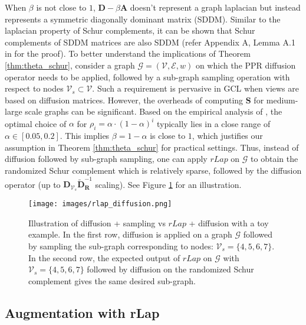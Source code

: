 \documentclass{article}
\def\mA{{\mathbf{A}}}
\def\mD{{\mathbf{D}}}
\def\mR{{\mathbf{R}}}
\def\mS{{\mathbf{S}}}
\def\gE{{\mathcal{E}}}
\def\gG{{\mathcal{G}}}
\def\gV{{\mathcal{V}}}
\theoremstyle{plain}
\theoremstyle{definition}
\theoremstyle{remark}
\begin{document}
When $\beta$ is not close to $1$, $\mD - \beta \mA$ doesn't represent a graph laplacian but instead represents a symmetric diagonally dominant matrix (SDDM). Similar to the laplacian property of Schur complements, it can be shown that Schur complements of SDDM matrices are also SDDM (refer Appendix A, Lemma A.1 in \citet{fahrbach2020faster} for the proof). To better understand the implications of Theorem \ref{thm:theta_schur}, consider a graph $\gG = (\gV, \gE, w)$ on which the PPR diffusion operator needs to be applied, followed by a sub-graph sampling operation with respect to nodes $\gV_s \subset \gV$. Such a requirement is pervasive in GCL when views are based on diffusion matrices. However, the overheads of computing $\mS$ for medium-large scale graphs can be significant. Based on the empirical analysis of \citet{klicpera2019diffusion}, the optimal choice of $\alpha$ for $\rho_i = \alpha \cdot (1 - \alpha)^i$ typically lies in a close range of $\alpha \in [0.05, 0.2]$. This implies $\beta = 1 - \alpha$ is close to $1$, which justifies our assumption in Theorem \ref{thm:theta_schur} for practical settings. Thus, instead of diffusion followed by sub-graph sampling, one can apply $rLap$ on $\gG$ to obtain the randomized Schur complement which is relatively sparse, followed by the diffusion operator (up to $\mD_{\gV_s}\widetilde{\mD}_{\mR}^{-1}$ scaling). See Figure \ref{fig:rlap_diffusion} for an illustration.


\begin{figure}[ht]
\vskip 0.2in
\centering
\centerline{\texttt{[image: images/rlap\_diffusion.png]}}
\caption{Illustration of diffusion + sampling vs $rLap$ + diffusion with a toy example. In the first row, diffusion is applied on a graph $\gG$ followed by sampling the sub-graph corresponding to nodes: $\gV_s = \{4,5,6,7\}$. In the second row, the expected output of $rLap$ on $\gG$ with $\gV_s = \{4,5,6,7\}$ followed by diffusion on the randomized Schur complement gives the same desired sub-graph.} 
\label{fig:rlap_diffusion}
\vskip -0.2in
\end{figure}


\subsection{Augmentation with rLap}
\end{document}
